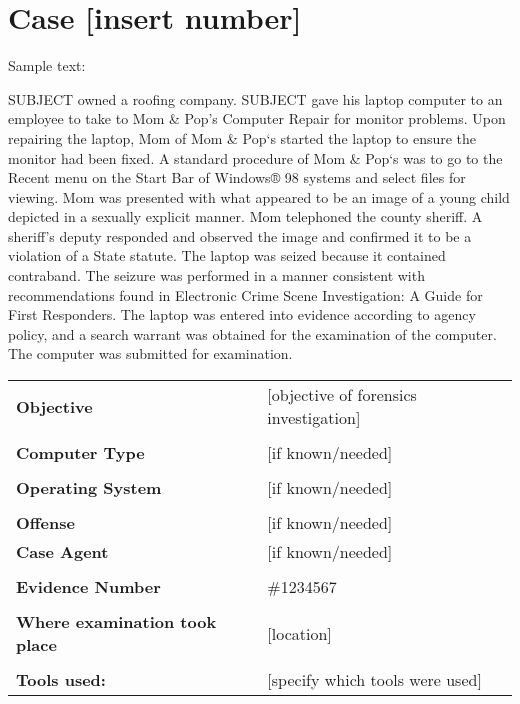 \setlength\headsep{10pt}
\section{Case [insert number]}

 
Sample text:

SUBJECT owned a roofing company. SUBJECT gave his laptop computer to an employee to take to Mom \& Pop's Computer Repair for monitor problems. Upon repairing the laptop, Mom of Mom \& Pop‘s started the laptop to ensure the monitor had been fixed. A standard procedure of Mom \& Pop‘s was to go to the Recent menu on the Start Bar of Windows® 98 systems and select files for viewing. Mom was presented with what appeared to be an image of a young child depicted in a sexually explicit manner. Mom telephoned the county sheriff. A sheriff's deputy responded and observed the image and confirmed it to be a violation of a State statute. The laptop was seized because it contained contraband. The seizure was performed in a manner consistent with recommendations found in Electronic Crime Scene Investigation: A Guide for First Responders. The laptop was entered into evidence according to agency policy, and a search warrant was obtained for the examination of the computer. The computer was submitted for examination. 


\begin{longtable}{p{}p{}}
\textbf{Objective} & [objective of forensics investigation]\\
&\\
\textbf{Computer Type} & [if known/needed]\\
&\\
\textbf{Operating System} & [if known/needed]\\
&\\
\textbf{Offense} & [if known/needed]\\
\textbf{Case Agent} & [if known/needed]\\
&\\
\textbf{Evidence Number} &  \#1234567\\
&\\
\textbf{Where examination took place} &  [location] \\
&\\
\textbf{Tools used:} & [specify which tools were used]  
\end{longtable}

\newpage